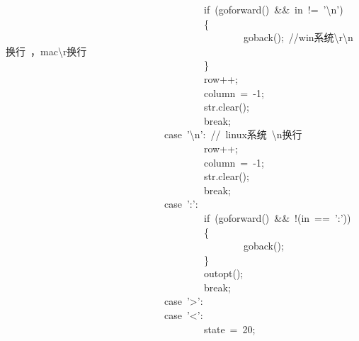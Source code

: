 \documentclass{article}
\begin{document}
\begin{mdpre}
~~~~~~~~~~~~~~~~~~~~~~~~~~~~~~~~~~~~~~~~{if}~(goforward()~\&\&~in~!=~{'}{\textbackslash{}n}{'})\\
~~~~~~~~~~~~~~~~~~~~~~~~~~~~~~~~~~~~~~~~\{\\
~~~~~~~~~~~~~~~~~~~~~~~~~~~~~~~~~~~~~~~~~~~~~~~~goback();~{//win系统\textbackslash{}r\textbackslash{}n换行~，mac\textbackslash{}r换行}\\
~~~~~~~~~~~~~~~~~~~~~~~~~~~~~~~~~~~~~~~~\}\\
~~~~~~~~~~~~~~~~~~~~~~~~~~~~~~~~~~~~~~~~row++;\\
~~~~~~~~~~~~~~~~~~~~~~~~~~~~~~~~~~~~~~~~column~=~-{1};\\
~~~~~~~~~~~~~~~~~~~~~~~~~~~~~~~~~~~~~~~~str.clear();\\
~~~~~~~~~~~~~~~~~~~~~~~~~~~~~~~~~~~~~~~~{break};\\
~~~~~~~~~~~~~~~~~~~~~~~~~~~~~~~~{case}~{'}{\textbackslash{}n}{'}:~{//~linux系统~\textbackslash{}n换行}\\
~~~~~~~~~~~~~~~~~~~~~~~~~~~~~~~~~~~~~~~~row++;\\
~~~~~~~~~~~~~~~~~~~~~~~~~~~~~~~~~~~~~~~~column~=~-{1};\\
~~~~~~~~~~~~~~~~~~~~~~~~~~~~~~~~~~~~~~~~str.clear();\\
~~~~~~~~~~~~~~~~~~~~~~~~~~~~~~~~~~~~~~~~{break};\\
~~~~~~~~~~~~~~~~~~~~~~~~~~~~~~~~{case}~{':'}:\\
~~~~~~~~~~~~~~~~~~~~~~~~~~~~~~~~~~~~~~~~{if}~(goforward()~\&\&~!(in~==~{':'}))\\
~~~~~~~~~~~~~~~~~~~~~~~~~~~~~~~~~~~~~~~~\{\\
~~~~~~~~~~~~~~~~~~~~~~~~~~~~~~~~~~~~~~~~~~~~~~~~goback();\\
~~~~~~~~~~~~~~~~~~~~~~~~~~~~~~~~~~~~~~~~\}\\
~~~~~~~~~~~~~~~~~~~~~~~~~~~~~~~~~~~~~~~~outopt();\\
~~~~~~~~~~~~~~~~~~~~~~~~~~~~~~~~~~~~~~~~{break};\\
~~~~~~~~~~~~~~~~~~~~~~~~~~~~~~~~{case}~{'\textgreater{}'}:\\
~~~~~~~~~~~~~~~~~~~~~~~~~~~~~~~~{case}~{'\textless{}'}:\\
~~~~~~~~~~~~~~~~~~~~~~~~~~~~~~~~~~~~~~~~state~=~{20};\\

\end{mdpre}
\end{document}
